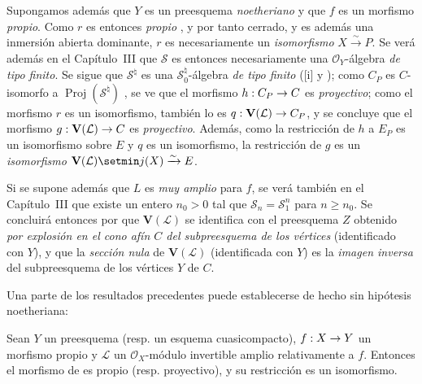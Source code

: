 \documentclass[oneside,10pt]{amsart}
\makeatletter
\newcommand{\ega@arrow}[2]{\mathchoice{#1}{#2}{#2}{#2}}
\renewcommand{\to}{\ega@arrow{\longrightarrow}{\rightarrow}}
\let\EGAOriginalLabel\label
\renewcommand{\label}[1]{\phantomsection\EGAOriginalLabel{#1}}
\makeatother
\begin{document}
\begin{remark}[8.8.3]
\label{II.8.8.3-fr}
Supongamos además que $Y$ es un preesquema \emph{noetheriano} y que $f$ es un morfismo \emph{propio}.
Como $r$ es entonces \emph{propio} , y por tanto cerrado, y es además una inmersión abierta dominante, $r$ es necesariamente un \emph{isomorfismo} $X\xrightarrow{\sim}P$.
Se verá además en el Capítulo~III  que $\mathcal{S}$ es entonces necesariamente una $\mathcal{O}_Y$-álgebra \emph{de tipo finito}.
Se sigue que $\mathcal{S}^{\natural}$ es una $\mathcal{S}_0^{\natural}$-álgebra \emph{de tipo finito} ([i] y );
como $C_P$ es $C$-isomorfo a $\operatorname{Proj}(\mathcal{S}^{\natural})$ , se ve que el morfismo $h:C_P\to C$ es \emph{proyectivo};
como el morfismo $r$ es un isomorfismo, también lo es $q:\mathbf{V}(\mathcal{L})\to C_P$, y se concluye que el morfismo $g:\mathbf{V}(\mathcal{L})\to C$ es \emph{proyectivo}.
Además, como la restricción de $h$ a $E_P$ es un isomorfismo sobre $E$ y $q$ es un isomorfismo, la restricción  de $g$ es un \emph{isomorfismo} $\mathbf{V}(\mathcal{L})\setmin j(X)\xrightarrow{\sim}E$.

Si se supone además que $L$ es \emph{muy amplio} para $f$, se verá también en el Capítulo~III  que existe un entero $n_0>0$ tal que $\mathcal{S}_n=\mathcal{S}_1^n$ para $n\geqslant n_0$.
Se concluirá entonces por  que $\mathbf{V}(\mathcal{L})$ se identifica con el preesquema $Z$ obtenido \emph{por explosión en el cono afín $C$ del subpreesquema de los vértices} (identificado con $Y$),
y que la \emph{sección nula} de $\mathbf{V}(\mathcal{L})$ (identificada con $Y$) es la \emph{imagen inversa} del subpreesquema de los vértices $Y$ de $C$.

Una parte de los resultados precedentes puede establecerse de hecho sin hipótesis noetheriana:
\end{remark}
\begin{corollary}[8.8.4]
\label{II.8.8.4-fr}
Sean $Y$ un preesquema \textup{(resp.} un esquema cuasicompacto\textup{)}, $f:X\to Y$ un morfismo propio y $\mathcal{L}$ un $\mathcal{O}_X$-módulo invertible amplio relativamente a $f$.
Entonces el morfismo de  es propio \textup{(resp.} proyectivo\textup{)}, y su restricción  es un isomorfismo.
\end{corollary}
\end{document}

